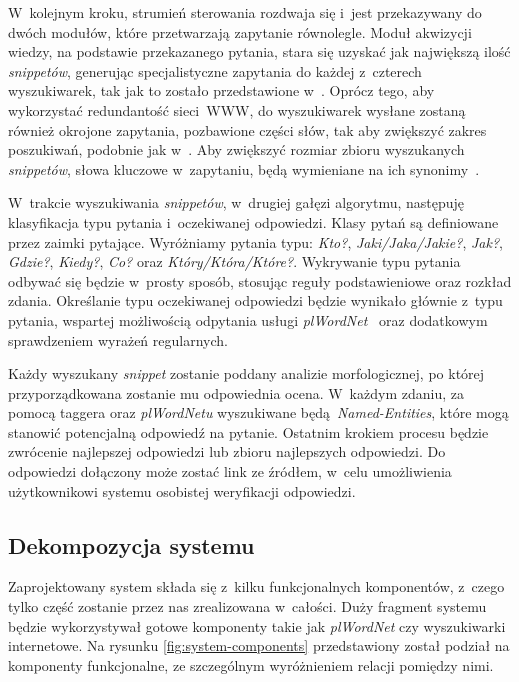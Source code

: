 W~kolejnym kroku, strumień sterowania rozdwaja się i~jest przekazywany do dwóch modułów, które przetwarzają zapytanie równolegle. Moduł akwizycji wiedzy, na podstawie przekazanego pytania, stara się uzyskać jak największą ilość \emph{snippetów}, generując specjalistyczne zapytania do każdej z~czterech wyszukiwarek, tak jak to zostało przedstawione w~\cite{zheng2002answerbus}. Oprócz tego, aby wykorzystać redundantość sieci~WWW, do wyszukiwarek wysłane zostaną również okrojone zapytania, pozbawione części słów, tak aby zwiększyć zakres poszukiwań, podobnie jak w~\cite{brill2002analysis}. Aby zwiększyć rozmiar zbioru wyszukanych \emph{snippetów}, słowa kluczowe w~zapytaniu, będą wymieniane na ich synonimy~\cite{przybyla-2013-question}.

W~trakcie wyszukiwania \emph{snippetów}, w~drugiej gałęzi algorytmu, następuję klasyfikacja typu pytania i~oczekiwanej odpowiedzi. Klasy pytań są definiowane przez zaimki pytające. Wyróżniamy pytania typu: \emph{Kto?}, \emph{Jaki/Jaka/Jakie?}, \emph{Jak?}, \emph{Gdzie?}, \emph{Kiedy?}, \emph{Co?} oraz \emph{Który/Która/Które?}. Wykrywanie typu pytania odbywać się będzie w~prosty sposób, stosując reguły podstawieniowe oraz rozkład zdania. Określanie typu oczekiwanej odpowiedzi będzie wynikało głównie z~typu pytania, wspartej możliwością odpytania usługi \emph{plWordNet}~\cite{MazPiaRudSzpaKedz:16} oraz dodatkowym sprawdzeniem wyrażeń regularnych.

Każdy wyszukany \emph{snippet} zostanie poddany analizie morfologicznej, po której przyporządkowana zostanie mu odpowiednia ocena. W~każdym zdaniu, za pomocą taggera oraz \emph{plWordNetu} wyszukiwane będą \emph{Named-Entities}, które mogą stanowić potencjalną odpowiedź na pytanie. Ostatnim krokiem procesu będzie zwrócenie najlepszej odpowiedzi lub zbioru najlepszych odpowiedzi. Do odpowiedzi dołączony może zostać link ze źródłem, w~celu umożliwienia użytkownikowi systemu osobistej weryfikacji odpowiedzi.

\subsection{Dekompozycja systemu}
Zaprojektowany system składa się z~kilku funkcjonalnych komponentów, z~czego tylko część zostanie przez nas zrealizowana w~całości. Duży fragment systemu będzie wykorzystywał gotowe komponenty takie jak \emph{plWordNet} czy wyszukiwarki internetowe. Na rysunku \ref{fig:system-components} przedstawiony został podział na komponenty funkcjonalne, ze szczególnym wyróżnieniem relacji pomiędzy nimi.

